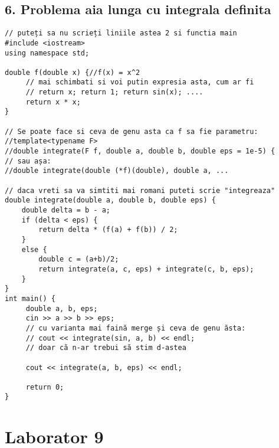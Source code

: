 \documentclass[11pt]{article}
\begin{document}
\subsection*{6. Problema aia lunga cu integrala definita}
\label{sec:orgd408ebc}
\begin{verbatim}
// puteți sa nu scrieți liniile astea 2 si functia main
#include <iostream>
using namespace std;

double f(double x) {//f(x) = x^2
     // mai schimbati si voi putin expresia asta, cum ar fi 
     // return x; return 1; return sin(x); ....
     return x * x;
}

// Se poate face si ceva de genu asta ca f sa fie parametru:
//template<typename F>
//double integrate(F f, double a, double b, double eps = 1e-5) {
// sau așa:
//double integrate(double (*f)(double), double a, ...

// daca vreti sa va simtiti mai romani puteti scrie "integreaza"
double integrate(double a, double b, double eps) {
    double delta = b - a;
    if (delta < eps) {
        return delta * (f(a) + f(b)) / 2;
    }
    else {
        double c = (a+b)/2;
        return integrate(a, c, eps) + integrate(c, b, eps);
    }
}
int main() {
     double a, b, eps;
     cin >> a >> b >> eps;
     // cu varianta mai faină merge și ceva de genu ăsta:
     // cout << integrate(sin, a, b) << endl;
     // doar că n-ar trebui să stim d-astea

     cout << integrate(a, b, eps) << endl;

     return 0;
}
\end{verbatim}
\pagebreak

\section*{Laborator 9}
\label{sec:org896f13c}
\end{document}
